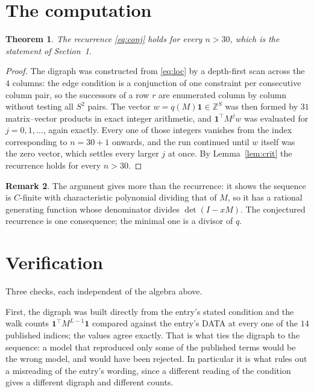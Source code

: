 \documentclass[11pt,a4paper]{article}
\theoremstyle{plain}
\newtheorem{theorem}{Theorem}
\theoremstyle{definition}
\newtheorem{remark}[theorem]{Remark}
\begin{document}
\section{The computation}

\begin{theorem}
The recurrence \eqref{eq:conj} holds for every $n>30$, which is the statement of
Section~1.
\end{theorem}

\begin{proof}
The digraph was constructed from \eqref{eq:loc} by a depth-first scan across the $4$
columns: the edge condition is a conjunction of one constraint per consecutive column
pair, so the successors of a row $r$ are enumerated column by column without testing all
$S^2$ pairs. The vector $w=q(M)\mathbf{1}\in\mathbb{Z}^{S}$ was then formed by $31$
matrix--vector products in exact integer arithmetic, and $\mathbf{1}^{\!\top}M^{j}w$ was
evaluated for $j=0,1,\dots$, again exactly. Every one of those integers vanishes from the
index corresponding to $n=30+1$ onwards, and the run continued until $w$ itself was the
zero vector, which settles every larger $j$ at once. By Lemma~\ref{lem:crit} the recurrence
holds for every $n>30$.
\end{proof}

\begin{remark}
The argument gives more than the recurrence: it shows the sequence is $C$-finite with
characteristic polynomial dividing that of $M$, so it has a rational generating function
whose denominator divides $\det(I-xM)$. The conjectured recurrence is one consequence; the
minimal one is a divisor of $q$.
\end{remark}

\section{Verification}

Three checks, each independent of the algebra above.

First, the digraph was built directly from the entry's stated condition and the walk counts
$\mathbf{1}^{\!\top}M^{L-1}\mathbf{1}$ compared against the entry's DATA at
every one of the $14$ published indices; the values agree exactly. That is what ties
the digraph to the sequence: a model that reproduced only some of the published terms would
be the wrong model, and would have been rejected. In particular it is what rules out a
misreading of the entry's wording, since a different reading of the condition gives a
different digraph and different counts.
\end{document}
